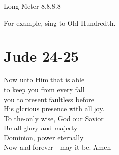 \documentclass{article}
\begin{document}
\noindent Long Meter 8.8.8.8

\noindent For example, sing to Old Hundredth.

\section*{Jude 24-25}

 Now unto Him that is able\\
to keep you from every fall\\
you to present faultless before\\
His glorious presence with all joy.\\

 To the-only wise, God our Savior\\
Be all glory and majesty\\
Dominion, power eternally\\
Now and forever---may it be. Amen\\
\end{document}
